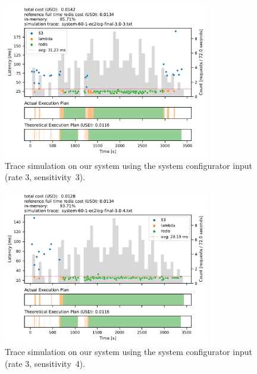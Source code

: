 \begin{figure}[t]
    \begin{center}
        \includegraphics[width=0.8\textwidth]{figures/system-60-1-ec2log-final-3.0-3.pdf}
        \caption{Trace simulation on our system using the system configurator input (rate 3, sensitivity~3).}
        \label{fig:ec2log_3_3}
    \end{center}
\end{figure}

\begin{figure}[t]
    \begin{center}
        \includegraphics[width=0.8\textwidth]{figures/system-60-1-ec2log-final-3.0-4.pdf}
        \caption{Trace simulation on our system using the system configurator input (rate 3, sensitivity~4).}
        \label{fig:ec2log_3_4}
    \end{center}
\end{figure}

